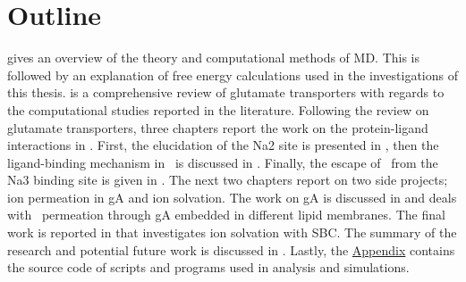 \section{Outline}
 gives an overview of the theory and computational methods of MD. This 
is followed by an explanation of free energy calculations used in the investigations of this 
thesis.  is a comprehensive review of glutamate transporters with regards 
to the computational studies reported in the literature. Following the review on glutamate 
transporters, three chapters report the work on the protein-ligand interactions in \GltPh. 
First, the elucidation of the Na2 site is presented in , then the ligand-binding 
mechanism in \GltPh\ is discussed in . Finally, the escape of \Na\ 
from the Na3 binding site is given in . The next two chapters report on 
two side projects; ion permeation in gA and ion solvation. The work on gA is discussed in 
\chapref{chap:gA} and deals with \K\ permeation through gA embedded in different lipid 
membranes. The final work is reported in \chapref{chap:ions} that investigates ion solvation 
with SBC. The summary of the research and potential future work is discussed in 
\chapref{chap:conc}. Lastly, the \hyperref[apx:funnel]{Appendix} contains the source code 
of scripts and programs used in analysis and simulations.
